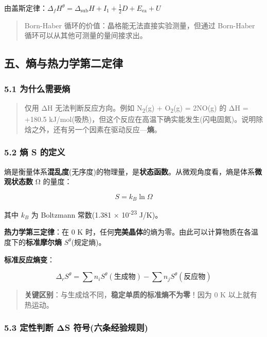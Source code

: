 由盖斯定律：\(\Delta_f H^\theta = \Delta_{\text{sub}}H + I_1 + \frac{1}{2}D + E_{\text{ea}} + U\)

\begin{quote}
Born-Haber 循环的价值：晶格能无法直接实验测量，但通过 Born-Haber 循环可以从其他可测量的量间接求出。
\end{quote}

\subsection{五、熵与热力学第二定律}\label{ux4e94ux71b5ux4e0eux70edux529bux5b66ux7b2cux4e8cux5b9aux5f8b}

\subsubsection{5.1 为什么需要熵}\label{ux4e3aux4ec0ux4e48ux9700ux8981ux71b5}

\begin{quote}
仅用 ΔH 无法判断反应方向。例如 N\textsubscript{2}(g) + O\textsubscript{2}(g) = 2NO(g) 的 ΔH = +180.5 kJ/mol(吸热)，但这个反应在高温下确实能发生(闪电固氮)。说明除焓之外，还有另一个因素在驱动反应---\textbf{熵}。
\end{quote}

\subsubsection{5.2 熵 S 的定义}\label{ux71b5-s-ux7684ux5b9aux4e49}

熵是衡量体系\textbf{混乱度}(无序度)的物理量，是\textbf{状态函数}。从微观角度看，熵是体系\textbf{微观状态数} Ω 的量度：

\[
S = k_B \ln \Omega
\]

其中 \(k_B\) 为 Boltzmann 常数(1.381 × 10\textsuperscript{-23} J/K)。

\textbf{热力学第三定律}：在 0 K 时，任何\textbf{完美晶体}的熵为零。由此可以计算物质在各温度下的\textbf{标准摩尔熵} \(S^\theta\)(规定熵)。

\textbf{标准反应熵变}：

\[
\Delta_r S^\theta = \sum n_i S^\theta(\text{生成物}) - \sum n_j S^\theta(\text{反应物})
\]

\begin{quote}
\textbf{关键区别}：与生成焓不同，\textbf{稳定单质的标准熵不为零}！因为 0 K 以上就有热运动。
\end{quote}

\subsubsection{5.3 定性判断 ΔS 符号(六条经验规则)}\label{ux5b9aux6027ux5224ux65ad-ux3b4s-ux7b26ux53f7ux516dux6761ux7ecfux9a8cux89c4ux5219}

